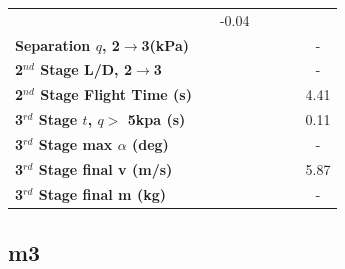 \begin{table}[ht]
\begin{tabular}{l c c c c c c}
	& \secondthirdSeparationgammamFuelOneHundredTenNoReturn
	&-0.04
	\\
	\textbf{Separation $q$, 2$\rightarrow$3(kPa)}
	& \secondthirdSeparationqmFuelNinetyNoReturn
	& \secondthirdSeparationqmFuelNinetyFiveNoReturn
	& \secondthirdSeparationqmFuelStandardNoReturn
	& \secondthirdSeparationqmFuelOneHundredFiveNoReturn
	& \secondthirdSeparationqmFuelOneHundredTenNoReturn
	& -
	\\
	\textbf{2$^{nd}$ Stage L/D, 2$\rightarrow$3}
	& \secondthirdSeparationLDmFuelNinetyNoReturn
	& \secondthirdSeparationLDmFuelNinetyFiveNoReturn
	& \secondthirdSeparationLDmFuelStandardNoReturn
	& \secondthirdSeparationLDmFuelOneHundredFiveNoReturn
	& \secondthirdSeparationLDmFuelOneHundredTenNoReturn
	& -
	\\
	\textbf{2$^{nd}$ Stage Flight Time (s)}
	& \secondFlightTimemFuelNinetyNoReturn
	& \secondFlightTimemFuelNinetyFiveNoReturn
	& \secondFlightTimemFuelStandardNoReturn
	& \secondFlightTimemFuelOneHundredFiveNoReturn
	& \secondFlightTimemFuelOneHundredTenNoReturn
	&4.41
	\\
	\textbf{3$^{rd}$ Stage $t$, $q >$ 5kpa (s)}
	& \thirdqOverFivemFuelNinetyNoReturn
	& \thirdqOverFivemFuelNinetyFiveNoReturn
	& \thirdqOverFivemFuelStandardNoReturn
	& \thirdqOverFivemFuelOneHundredFiveNoReturn
	& \thirdqOverFivemFuelOneHundredTenNoReturn
	&0.11
	\\
	\textbf{3$^{rd}$ Stage max $\alpha$ (deg)}
	& \thirdmaxAoAmFuelNinetyNoReturn
	& \thirdmaxAoAmFuelNinetyFiveNoReturn
	& \thirdmaxAoAmFuelStandardNoReturn
	& \thirdmaxAoAmFuelOneHundredFiveNoReturn
	& \thirdmaxAoAmFuelOneHundredTenNoReturn
	& -
	\\
	\textbf{3$^{rd}$ Stage final v (m/s)}
	& \thirdcircvmFuelNinetyNoReturn
	& \thirdcircvmFuelNinetyFiveNoReturn
	& \thirdcircvmFuelStandardNoReturn
	& \thirdcircvmFuelOneHundredFiveNoReturn
	& \thirdcircvmFuelOneHundredTenNoReturn
	&5.87
	\\
	\textbf{3$^{rd}$ Stage final m (kg)}
	& \thirdcircmmFuelNinetyNoReturn
	& \thirdcircmmFuelNinetyFiveNoReturn
	& \thirdcircmmFuelStandardNoReturn
	& \thirdcircmmFuelOneHundredFiveNoReturn
	& \thirdcircmmFuelOneHundredTenNoReturn
	& -
	\\
	\hline 
\end{tabular} 
\end{table}

\subsection{m3}

